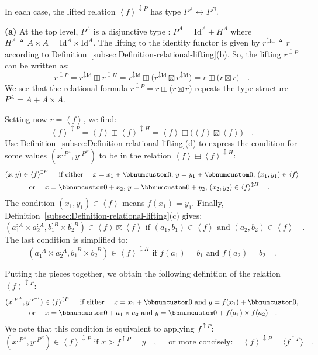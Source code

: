 In each case, the lifted relation $\left<f\right>^{\updownarrow P}$
has type $P^{A}\leftrightarrow P^{B}$.

\textbf{(a)} At the top level, $P^{A}$ is a disjunctive type : $P^{A}=\text{Id}^{A}+H^{A}$
where $H^{A}\triangleq A\times A=\text{Id}^{A}\times\text{Id}^{A}$.
The lifting to the identity functor is given by $r^{\updownarrow\text{Id}}\triangleq r$
according to Definition~\ref{subsec:Definition-relational-lifting}(b).
So, the lifting $r^{\updownarrow P}$ can be written as:
\[
r^{\updownarrow P}=r^{\updownarrow\text{Id}}\boxplus r^{\updownarrow H}=r^{\updownarrow\text{Id}}\boxplus\big(r^{\updownarrow\text{Id}}\boxtimes r^{\updownarrow\text{Id}}\big)=r\boxplus\big(r\boxtimes r\big)\quad.
\]
We see that the relational formula $r^{\updownarrow P}=r\boxplus\big(r\boxtimes r\big)$
repeats the type structure $P^{A}=A+A\times A$.

Setting now $r=\left<f\right>$, we find:
\[
\left<f\right>^{\updownarrow P}=\left<f\right>\boxplus\left<f\right>^{\updownarrow H}=\left<f\right>\boxplus\big(\left<f\right>\boxtimes\left<f\right>\big)\quad.
\]
Use Definition~\ref{subsec:Definition-relational-lifting}(d) to
express the condition for some values $(x^{:P^{A}},y^{:P^{B}})$ to
be in the relation $\left<f\right>\boxplus\left<f\right>^{\updownarrow H}$:
\begin{align*}
 & (x,y)\in\left<f\right>^{\updownarrow P}\quad\text{ if either }\quad x=x_{1}+\bbnum 0,\,y=y_{1}+\bbnum 0,\,(x_{1},y_{1})\in\left<f\right>\\
 & \quad\quad\quad\text{ or }\quad x=\bbnum 0+x_{2},\,y=\bbnum 0+y_{2},\,(x_{2},y_{2})\in\left<f\right>^{\updownarrow H}\quad.
\end{align*}
The condition $(x_{1},y_{1})\in\left<f\right>$ means $f(x_{1})=y_{1}$.
Finally, Definition~\ref{subsec:Definition-relational-lifting}(c)
gives:
\[
(a_{1}^{:A}\times a_{2}^{:A},b_{1}^{:B}\times b_{2}^{:B})\in\left<f\right>\boxtimes\left<f\right>\text{ if }(a_{1},b_{1})\in\left<f\right>\text{ and }(a_{2},b_{2})\in\left<f\right>\quad.
\]
The last condition is simplified to:
\[
(a_{1}^{:A}\times a_{2}^{:A},b_{1}^{:B}\times b_{2}^{:B})\in\left<f\right>^{\updownarrow H}\text{ if }f(a_{1})=b_{1}\text{ and }f(a_{2})=b_{2}\quad.
\]

Putting the pieces together, we obtain the following definition of
the relation $\left<f\right>^{\updownarrow P}$:
\begin{align*}
 & (x^{:P^{A}},y^{:P^{B}})\in\left<f\right>^{\updownarrow P}\quad\text{ if either }\quad x=x_{1}+\bbnum 0\text{ and }y=f(x_{1})+\bbnum 0,\\
 & \quad\quad\quad\text{ or }\quad x=\bbnum 0+a_{1}\times a_{2}\text{ and }y=\bbnum 0+f(a_{1})\times f(a_{2})\quad.
\end{align*}
We note that this condition is equivalent to applying $f^{\uparrow P}$:
\[
(x^{:P^{A}},y^{:P^{B}})\in\left<f\right>^{\updownarrow P}\text{ if }x\triangleright f^{\uparrow P}=y\quad,\quad\text{ or more concisely}:\quad\left<f\right>^{\updownarrow P}=\langle f^{\uparrow P}\rangle\quad.
\]

